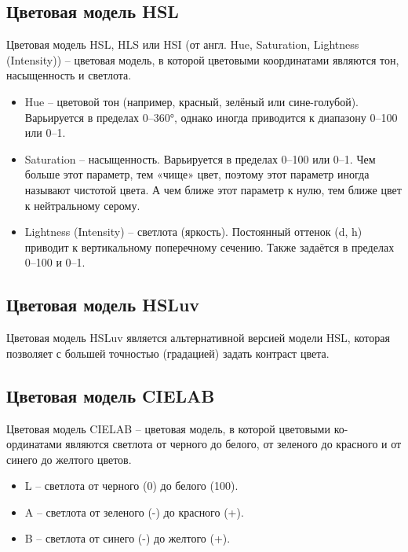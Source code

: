 \documentclass[a4paper,14pt, unknownkeysallowed]{extreport}
\begin{document}
    \subsection{Цветовая модель HSL}
    \label{sec:HSL_model}

    Цветовая модель HSL, HLS или HSI (от англ. Hue, Saturation, Lightness (Intensity)) – цветовая модель, в которой цветовыми координатами являются тон, насыщенность и светлота.

    \begin{itemize}
        \item Hue – цветовой тон (например, красный, зелёный или сине-голубой). Варьируется в пределах 0–360°, однако иногда приводится к диапазону 0–100 или 0–1.
        \item Saturation – насыщенность. Варьируется в пределах 0–100 или 0–1. Чем больше этот параметр, тем «чище» цвет, поэтому этот параметр иногда называют чистотой цвета. А чем ближе этот параметр к нулю, тем ближе цвет к нейтральному серому.
        \item Lightness (Intensity) – светлота (яркость). Постоянный оттенок (d, h) приводит к вертикальному поперечному сечению. Также задаётся в пределах 0–100 и 0–1.
    \end{itemize}

    \subsection{Цветовая модель HSLuv}
    Цветовая модель HSLuv является альтернативной версией модели HSL, которая позволяет с большей точностью (градацией) задать контраст цвета.

    \subsection{Цветовая модель CIELAB}

    Цветовая модель CIELAB – цветовая модель, в которой цветовыми ко- ординатами являются светлота от черного до белого, от зеленого до красного и от синего до желтого цветов.

    \begin{itemize}
        \item L – светлота от черного (0) до белого (100).
        \item A – светлота от зеленого (-) до красного (+).
        \item B – светлота от синего (-) до желтого (+).
    \end{itemize}
\end{document}
